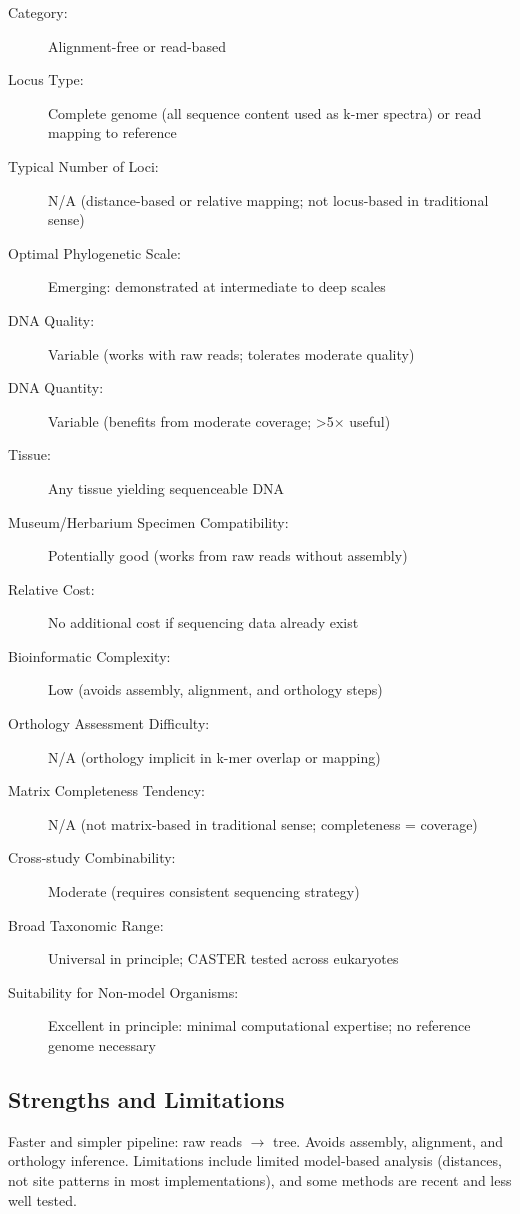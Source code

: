 \begin{description}
\item[Category:] Alignment-free or read-based
\item[Locus Type:] Complete genome (all sequence content used as k-mer spectra) or read mapping to reference
\item[Typical Number of Loci:] N/A (distance-based or relative mapping; not locus-based in traditional sense)
\item[Optimal Phylogenetic Scale:] Emerging: demonstrated at intermediate to deep scales
\item[DNA Quality:] Variable (works with raw reads; tolerates moderate quality)
\item[DNA Quantity:] Variable (benefits from moderate coverage; >5$\times$ useful)
\item[Tissue:] Any tissue yielding sequenceable DNA
\item[Museum/Herbarium Specimen Compatibility:] Potentially good (works from raw reads without assembly)
\item[Relative Cost:] No additional cost if sequencing data already exist
\item[Bioinformatic Complexity:] Low (avoids assembly, alignment, and orthology steps)
\item[Orthology Assessment Difficulty:] N/A (orthology implicit in k-mer overlap or mapping)
\item[Matrix Completeness Tendency:] N/A (not matrix-based in traditional sense; completeness = coverage)
\item[Cross-study Combinability:] Moderate (requires consistent sequencing strategy)
\item[Broad Taxonomic Range:] Universal in principle; CASTER tested across eukaryotes
\item[Suitability for Non-model Organisms:] Excellent in principle: minimal computational expertise; no reference genome necessary
\end{description}

\subsection{Strengths and Limitations}

Faster and simpler pipeline: raw reads $\rightarrow$ tree. Avoids assembly, alignment, and orthology inference. Limitations include limited model-based analysis (distances, not site patterns in most implementations), and some methods are recent and less well tested.

